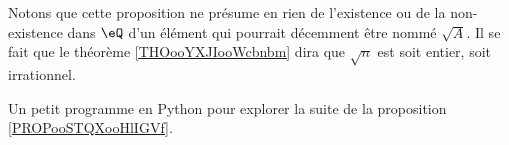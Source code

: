 Notons que cette proposition ne présume en rien de l'existence ou de la non-existence dans \( \eQ\) d'un élément qui pourrait décemment être nommé \( \sqrt{ A }\). Il se fait que le théorème \ref{THOooYXJIooWcbnbm} dira que \( \sqrt{ n }\) est soit entier, soit irrationnel.

\begin{normaltext}
	Un petit programme en Python pour explorer la suite de la proposition \ref{PROPooSTQXooHlIGVf}.
	
\end{normaltext}
